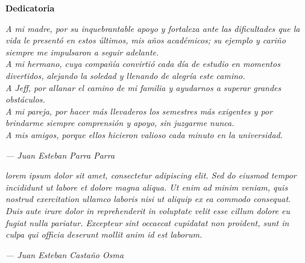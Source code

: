 \cleardoublepage%
%
\thispagestyle{empty}

\vspace*{\fill}

\begin{center}
	{\Large\bfseries Dedicatoria}
\end{center}


\begin{center}
	\textit{
		A mi madre, por su inquebrantable apoyo y fortaleza ante las dificultades que la vida le presentó en estos últimos, mis años académicos; su ejemplo y cariño siempre me impulsaron a seguir adelante.\\
		A mi hermano, cuya compañía convirtió cada día de estudio en momentos divertidos, alejando la soledad y llenando de alegría este camino.\\
		A Jeff, por allanar el camino de mi familia y ayudarnos a superar grandes obstáculos.\\
		A mi pareja, por hacer más llevaderos los semestres más exigentes y por brindarme siempre comprensión y apoyo, sin juzgarme nunca.\\
		A mis amigos, porque ellos hicieron valioso cada minuto en la universidad.
	}
	\vspace{2cm}

	\hfill \textit{--- Juan Esteban Parra Parra}

	\vspace{3cm}

	\textit{
		lorem ipsum dolor sit amet, consectetur adipiscing elit. Sed do eiusmod tempor incididunt ut labore et dolore magna aliqua. Ut enim ad minim veniam, quis nostrud exercitation ullamco laboris nisi ut aliquip ex ea commodo consequat. Duis aute irure dolor in reprehenderit in voluptate velit esse cillum dolore eu fugiat nulla pariatur. Excepteur sint occaecat cupidatat non proident, sunt in culpa qui officia deserunt mollit anim id est laborum.
	}

	\vspace{2cm}

	\hfill \textit{--- Juan Esteban Castaño Osma}
\end{center}
